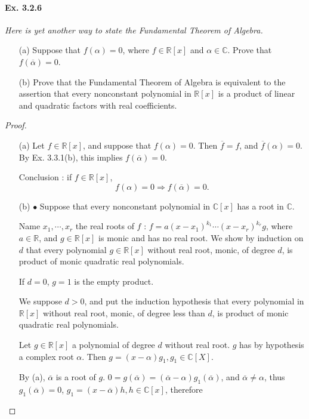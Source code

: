 \documentclass[11pt,a4paper]{article}
\newcommand{\R}{\mathbb{R}}
\newcommand{\C}{\mathbb{C}}
\begin{document}
\paragraph{Ex. 3.2.6}

{\it Here is yet another way to state the Fundamental Theorem of Algebra.
\begin{enumerate}
\item[(a)] Suppose that $f(\alpha) = 0$, where $f\in \R[x]$ and $\alpha \in \C$. Prove that $f(\overline{\alpha}) = 0$.
\item[(b)] Prove that the Fundamental Theorem of Algebra is equivalent to the assertion that every nonconstant polynomial in $\R[x]$ is a product of linear and quadratic factors with real coefficients.
\end{enumerate}
}

\begin{proof}
\begin{enumerate}
\item[(a)] Let $f \in \mathbb{R}[x]$, and suppose that $f(\alpha)=0$. Then $\overline{f} = f$, and $\overline{f}(\alpha)=0$.
By Ex. 3.3.1(b), this implies $f(\overline{\alpha}) =0$.

Conclusion : if $f \in \mathbb{R}[x]$, $$f(\alpha)=0 \Rightarrow f(\overline{\alpha})=0.$$ 
\item[(b)]
$\bullet$ Suppose that every nonconstant polynomial in $\mathbb{C}[x]$ has a root in $\mathbb{C}$.

Name $x_1,\cdots, x_r$ the real roots of $f$ : $f = a(x-x_1)^{k_1}\cdots(x-x_r)^{k_r}g$, where $a \in \mathbb{R}$, and  $g \in \mathbb{R}[x]$ is monic and has no real root.
We show by induction on  $d$ that every polynomial $g \in \mathbb{R}[x]$ without real root, monic, of degree $d$, is product of monic quadratic real polynomials.

If $d=0$, $g=1$ is the empty product.

We suppose $d>0$, and put the induction hypothesis that  every polynomial  in $ \mathbb{R}[x]$ without real root, monic, of degree less than $d$, is product of monic quadratic real polynomials.

Let $g \in \R[x]$ a polynomial of degree $d$ without real root. $g$ has by hypothesis a complex root $\alpha$. Then $g = (x-\alpha)g_1, g_1\in \mathbb{C}[X]$.

By (a), $\overline{\alpha}$ is a root of $g$. $0 = g(\overline{\alpha}) = (\overline{\alpha} - \alpha) g_1(\overline{\alpha})$, and $\overline{\alpha} \neq  \alpha$, thus $g_1(\overline{\alpha})=0$, $g_1 = (x- \overline{\alpha}) h, h \in \mathbb{C}[x]$, therefore


\end{enumerate}
\end{proof}
\end{document}
